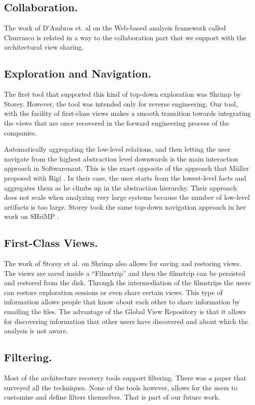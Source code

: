 \documentclass[preprint,12pt]{elsarticle}
\begin{document}
\subsection {Collaboration.} The work of D’Ambros et. al on the Web-based analysis framework called Churrasco is related in a way to the collaboration part that we support with the architectural view sharing. 

\subsection {Exploration and Navigation.} The first tool that supported this kind of top-down exploration was Shrimp by Storey. However, the tool was intended only for reverse engineering. Our tool, with the facility of first-class views makes a smooth transition towards integrating the views that are once recovered in the forward engineering process of the companies.

Automatically aggregating the low-level relations, and then letting the user navigate from the highest abstraction level downwards is the main interaction approach in Softwarenaut. This is the exact opposite of the approach that M{\"u}ller proposed with Rigi \cite{muller-revengenv}. In their case, the user starts from the lowest-level facts and aggregates them as he climbs up in the abstraction hierarchy. Their approach does not scale when analyzing very large systems because the number of low-level artifacts is too large. Storey took the same top-down navigation approach in her work on SHriMP \cite{storey-shrimp}.

\subsection {First-Class Views.} The work of Storey et al. on Shrimp also allows for saving and restoring views. The views are saved inside a “Filmstrip” and then the filmstrip can be persisted and restored from the disk. Through the intermediation of the filmstrips the users can restore exploration sessions or even share certain views. This type of information allows people that know about each other to share information by emailing the files. The advantage of the Global View Repository is that it allows for discovering information that other users have discovered and about which the analysis is not aware. 

\subsection {Filtering.} Most of the architecture recovery tools support filtering. There was a paper that surveyed all the techniques. None of the tools however, allows for the users to customize and define filters themselves. That is part of our future work. 
\end{document}
